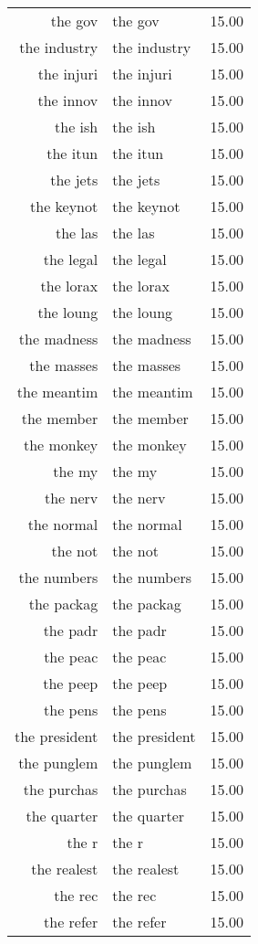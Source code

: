 \begin{table}[ht]
\begin{tabular}{rlr}
  the gov & the gov & 15.00 \\ 
  the industry & the industry & 15.00 \\ 
  the injuri & the injuri & 15.00 \\ 
  the innov & the innov & 15.00 \\ 
  the ish & the ish & 15.00 \\ 
  the itun & the itun & 15.00 \\ 
  the jets & the jets & 15.00 \\ 
  the keynot & the keynot & 15.00 \\ 
  the las & the las & 15.00 \\ 
  the legal & the legal & 15.00 \\ 
  the lorax & the lorax & 15.00 \\ 
  the loung & the loung & 15.00 \\ 
  the madness & the madness & 15.00 \\ 
  the masses & the masses & 15.00 \\ 
  the meantim & the meantim & 15.00 \\ 
  the member & the member & 15.00 \\ 
  the monkey & the monkey & 15.00 \\ 
  the my & the my & 15.00 \\ 
  the nerv & the nerv & 15.00 \\ 
  the normal & the normal & 15.00 \\ 
  the not & the not & 15.00 \\ 
  the numbers & the numbers & 15.00 \\ 
  the packag & the packag & 15.00 \\ 
  the padr & the padr & 15.00 \\ 
  the peac & the peac & 15.00 \\ 
  the peep & the peep & 15.00 \\ 
  the pens & the pens & 15.00 \\ 
  the president & the president & 15.00 \\ 
  the punglem & the punglem & 15.00 \\ 
  the purchas & the purchas & 15.00 \\ 
  the quarter & the quarter & 15.00 \\ 
  the r & the r & 15.00 \\ 
  the realest & the realest & 15.00 \\ 
  the rec & the rec & 15.00 \\ 
  the refer & the refer & 15.00 \\ 

\end{tabular}
\end{table}
